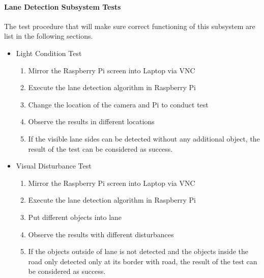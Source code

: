 \documentclass[a4paper,12pt]{article}
\begin{document}
	\paragraph{Lane Detection Subsystem Tests}	
	The test procedure that will make sure correct functioning of this subsystem are list in the following sections.
	\begin{itemize}
		\item{Light Condition Test}
				\begin{enumerate}
				\item Mirror the Raspberry Pi screen into Laptop via VNC  \vspace{-0.2cm}
				\item Execute the lane detection algorithm in Raspberry Pi \vspace{-0.2cm}
				\item Change the location of the camera and Pi to conduct test \vspace{-0.2cm}
				\item Observe the results in different locations   \vspace{-0.2cm}
				\item If the visible lane sides can be detected without any additional object, the result of the test can be considered as success. \vspace{-0.2cm}
			\end{enumerate}
		\item{Visual Disturbance Test}
			\begin{enumerate}
			\item Mirror the Raspberry Pi screen into Laptop via VNC  \vspace{-0.2cm}
			\item Execute the lane detection algorithm in Raspberry Pi \vspace{-0.2cm}
			\item Put different objects into lane \vspace{-0.2cm}
			\item Observe the results with different disturbances\vspace{-0.2cm}
			\item If the objects outside of lane is not detected and the objects inside the road only detected only at its border with road, the result of the test can be considered as success. \vspace{-0.2cm}
		\end{enumerate}
	\end{itemize}
	
\end{document}
